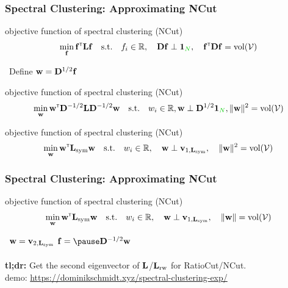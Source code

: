 \documentclass{beamer}
\begin{document}
\begin{frame}
\frametitle{Spectral Clustering: Approximating NCut}
\begin{block}{\centering objective function of spectral clustering (NCut)}
\[
\min_{\bff} \bff\transpose \bL \bff \quad {\rm s.t.} 
\quad f_i \in \R,
\quad \bD\bff \perp \bOne_\nodes, 
\quad \bff\transpose \bD \bff  = {\rm vol}(\nodeset)
\]
\end{block}
 \, \pause Define $\mathbf{w} = \mathbf{D}^{1/2}\mathbf{f}$ \pause
\begin{block}{\centering objective function of spectral clustering (NCut)}
\[
\min_{\bw} \bw \transpose \bD^{-1/2} \bL \bD^{-1/2}\bw \quad {\rm s.t.} 
\quad w_i \in \R,
\bw \perp \bD^{1/2}\bOne_\nodes, 
\|\bw\|^2  = {\rm vol}(\nodeset)
\]
\end{block} \pause

\begin{block}{\centering objective function of spectral clustering (NCut)}
\[  
\min_{\mathbf{w}} \mathbf{w} ^\mathsf{\scriptscriptstyle T}  \mathbf{L}_{\rm sym} \mathbf{w} \quad {\rm s.t.} 
\quad w_i \in \mathbb{R},
\quad \mathbf{w} \perp \mathbf{v}_{1, \mathbf{L}_{\rm sym}}, 
\quad \|\mathbf{w}\|^2  = {\rm vol}(\mathcal{V})
\]
\end{block} 
\end{frame}
\begin{frame}
\frametitle{Spectral Clustering: Approximating NCut}
\begin{block}{\centering objective function of spectral clustering (NCut)}
\vspace{-1em}	
\[  
\min_{\mathbf{w}} \mathbf{w} ^\mathsf{\scriptscriptstyle T}  \mathbf{L}_{\rm sym} \mathbf{w} \quad {\rm s.t.} 
\quad w_i \in \mathbb{R},
\quad \mathbf{w} \perp \mathbf{v}_{1, \mathbf{L}_{\rm sym}}, 
\quad \|\mathbf{w}\|  = {\rm vol}(\mathcal{V})
\]
\end{block} \pause \bigskip
{} \, 
\pause $\mathbf{w} = \mathbf{v}_{2, \mathbf{L}_{\rm sym}}$
\pause $\bff =  \pause \bD^{-1/2}\bw$
\pause \\ \bigskip
{} 
\pause \\ \bigskip
\textbf{tl;dr:} Get the second eigenvector of $\mathbf{L}$/$\mathbf{L}_{\rm rw}$  for RatioCut/NCut. 
\pause \\ \bigskip
{\tiny demo: \url{https://dominikschmidt.xyz/spectral-clustering-exp/}}\\

\end{frame}
\end{document}
